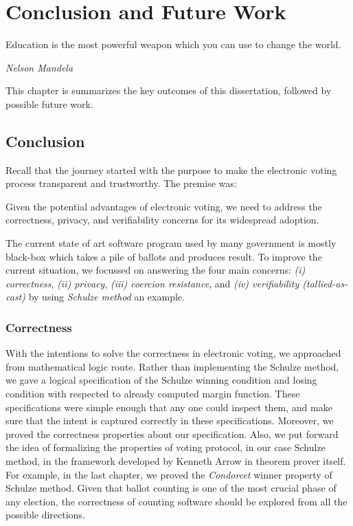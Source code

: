 \chapter{Conclusion and Future Work}
\label{cha:conc}

\epigraph{Education is the most powerful weapon which you can use to change the world.} 
{\textit{Nelson Mandela}}

This chapter is summarizes the key outcomes of this dissertation, followed by possible 
future work. 

\section{Conclusion}
Recall that the journey started with the purpose to make the electronic voting 
process transparent and trustworthy.  The premise was:

\begin{displayquote}
Given the potential advantages of electronic voting, we need to address the correctness,
privacy, and verifiability concerns for its widespread adoption.
\end{displayquote}

The current state of 
art software program used by many government is mostly black-box which 
takes a pile of ballots and produces result.  To improve the current situation, 
we focussed on answering the 
four main concerns: \textit{(i) correctness}, \textit{(ii) privacy},
\textit{(iii) coercion resistance}, and \textit{(iv) verifiability (tallied-as-cast)} by 
using \textit{Schulze method} an example. 

\subsection{Correctness}
With the intentions to solve the 
correctness in electronic voting, we approached from 
mathematical logic route.  Rather than implementing the Schulze method, 
we gave a logical specification of the Schulze winning condition and losing 
condition with respected to already computed margin function. 
These specifications were simple enough that 
any one could inspect them, and 
make sure that the intent is captured correctly in these specifications. 
Moreover, we proved the correctness properties about our specification.
Also, we put forward the idea of formalizing the properties 
of voting protocol, in our case Schulze method, in the framework developed by Kenneth Arrow 
in theorem prover itself. For example, 
in the last chapter, we proved the \textit{Condorcet} winner property 
of Schulze method. Given that ballot counting is one of the most 
crucial phase of any election, the correctness of counting software 
should be explored from all the possible directions. 

